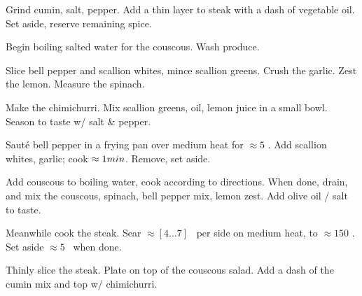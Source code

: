 \begin{preparation}
\item Grind cumin, salt, pepper.
	Add a thin layer to steak with a dash of vegetable oil.
	Set aside, reserve remaining spice.

\item Begin boiling salted water for the couscous.
	Wash produce.

\item Slice bell pepper and scallion whites, mince scallion greens.
	Crush the garlic.
	Zest the lemon.
	Measure the spinach.

\item Make the chimichurri.
	Mix scallion greens, oil, lemon juice in a small bowl.
	Season to taste w/ salt \& pepper.

\item Saut\'{e} bell pepper in a frying pan over medium heat for $\approx 5$ \minute.
	Add scallion whites, garlic; cook $\approx 1 \minute$.
	Remove, set aside.

\item Add couscous to boiling water, cook according to directions.
	When done, drain, and mix the couscous, spinach, bell pepper mix, lemon zest.
	Add olive oil / salt to taste.

\item Meanwhile cook the steak.
	Sear $\approx [4 \dots 7]$ \minute~per side on medium heat, to $\approx 150$ \Fahrenheit.
	Set aside $\approx 5$ \minute~when done.

\item Thinly slice the steak.
	Plate on top of the couscous salad.
	Add a dash of the cumin mix and top w/ chimichurri.
\end{preparation}


\recipeend%
